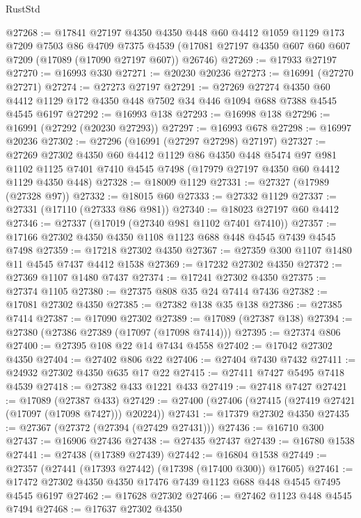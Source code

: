 \begin{lexlean}{RustStd}
\begin{coremodule}
@27268 := @17841
    @27197
    @4350
    @4350
    @448
    @60
    @4412
    @1059
    @1129
    @173
    @7209
    @7503
    @86
    @4709
    @7375
    @4539
    (@17081 @27197 @4350 @607 @60 @607 @7209 (@17089 (@17090 @27197 @607)) @26746)
@27269 := @17933 @27197
@27270 := @16993 @330
@27271 := @20230 @20236
@27273 := @16991 (@27270 @27271)
@27274 := @27273 @27197
@27291 := @27269
    @27274
    @4350
    @60
    @4412
    @1129
    @172
    @4350
    @448
    @7502
    @34
    @446
    @1094
    @688
    @7388
    @4545
    @4545
    @6197
@27292 := @16993 @138
@27293 := @16998 @138
@27296 := @16991 (@27292 (@20230 @27293))
@27297 := @16993 @678
@27298 := @16997 @20236
@27302 := @27296 (@16991 (@27297 @27298) @27197)
@27327 := @27269
    @27302
    @4350
    @60
    @4412
    @1129
    @86
    @4350
    @448
    @5474
    @97
    @981
    @1102
    @1125
    @7401
    @7410
    @4545
    @7498
    (@17979 @27197 @4350 @60 @4412 @1129 @4350 @448)
@27328 := @18009 @1129
@27331 := @27327 (@17989 (@27328 @97))
@27332 := @18015 @60
@27333 := @27332 @1129
@27337 := @27331 (@17110 (@27333 @86 @981))
@27340 := @18023 @27197 @60 @4412
@27346 := @27337 (@17019 (@27340 @981 @1102 @7401 @7410))
@27357 := @17166 @27302 @4350 @4350 @1108 @1123 @688 @448 @4545 @7439 @4545 @7498
@27359 := @17218 @27302 @4350
@27367 := @27359 @300 @1107 @1480 @11 @4545 @7437 @4412 @1538
@27369 := @17232 @27302 @4350
@27372 := @27369 @1107 @1480 @7437
@27374 := @17241 @27302 @4350
@27375 := @27374 @1105
@27380 := @27375 @808 @35 @24 @7414 @7436
@27382 := @17081 @27302 @4350
@27385 := @27382 @138 @35 @138
@27386 := @27385 @7414
@27387 := @17090 @27302
@27389 := @17089 (@27387 @138)
@27394 := @27380 (@27386 @27389 (@17097 (@17098 @7414)))
@27395 := @27374 @806
@27400 := @27395 @108 @22 @14 @7434 @4558
@27402 := @17042 @27302 @4350
@27404 := @27402 @806 @22
@27406 := @27404 @7430 @7432
@27411 := @24932 @27302 @4350 @635 @17 @22
@27415 := @27411 @7427 @5495 @7418 @4539
@27418 := @27382 @433 @1221 @433
@27419 := @27418 @7427
@27421 := @17089 (@27387 @433)
@27429 := @27400 (@27406 (@27415 (@27419 @27421 (@17097 (@17098 @7427))) @20224))
@27431 := @17379 @27302 @4350
@27435 := @27367 (@27372 (@27394 (@27429 @27431)))
@27436 := @16710 @300
@27437 := @16906 @27436
@27438 := @27435 @27437
@27439 := @16780 @1538
@27441 := @27438 (@17389 @27439)
@27442 := @16804 @1538
@27449 := @27357 (@27441 (@17393 @27442) (@17398 (@17400 @300)) @17605)
@27461 := @17472 @27302 @4350 @4350 @17476 @7439 @1123 @688 @448 @4545 @7495 @4545 @6197
@27462 := @17628 @27302
@27466 := @27462 @1123 @448 @4545 @7494
@27468 := @17637 @27302 @4350

\end{coremodule}
\end{lexlean}
